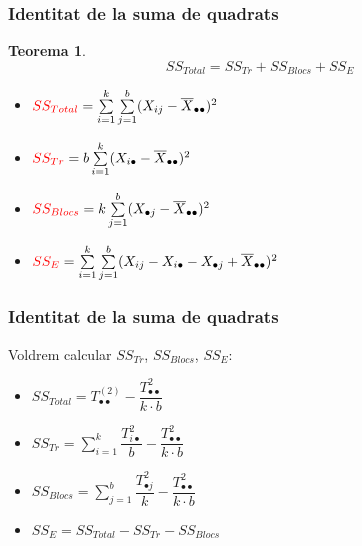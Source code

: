 \documentclass[12pt,t]{beamer}
\newcommand{\red}[1]{\textcolor{red}{#1}}
\theoremstyle{plain}
\newtheorem{teorema}{Teorema}
\theoremstyle{definition}
\begin{document}
\begin{frame}
\frametitle{Identitat de la suma de quadrats}
\begin{teorema}
$$
SS_{Total}=SS_{Tr}+SS_{Blocs}+SS_E
$$
\end{teorema}


\begin{itemize}
\item $\red{SS_{Total}} = \sum\limits_{i=1}^k\sum\limits_{j=1}^b (X_{ij}-
\overline{X}_{\bullet\bullet})^2$
\medskip

\item $\red{SS_{Tr}}=b \sum\limits_{i=1}^k
(X_{i\bullet}-\overline{X}_{\bullet\bullet})^2$\medskip

\item $\red{SS_{Blocs}}=k \sum\limits_{j=1}^b (X_{\bullet
j}-\overline{X}_{\bullet\bullet})^2 $
\medskip

\item $\red{SS_E}= \sum\limits_{i=1}^k\sum\limits_{j=1}^b (X_{ij} - X_{i\bullet}-
X_{\bullet j}+\overline{X}_{\bullet\bullet})^2$
\end{itemize}
\end{frame}


\begin{frame}
\frametitle{Identitat de la suma de quadrats}

Voldrem calcular $SS_{Tr}$, $SS_{Blocs}$, $SS_E$:
\medskip

\begin{itemize}
\item $\displaystyle SS_{Total}=T_{\bullet\bullet}^{(2)}-\dfrac{T_{\bullet\bullet}^2}{k\cdot b}$
\medskip

\item $\displaystyle SS_{Tr}= \sum\limits_{i=1}^k\dfrac{T_{i\bullet}^2}{b}-\dfrac{T_{\bullet\bullet}^2}{k\cdot b}$
\medskip


\item $\displaystyle SS_{Blocs}= \sum\limits_{j=1}^b \dfrac{T_{\bullet
j}^2}{k}-\dfrac{T_{\bullet\bullet}^2}{k\cdot b}$
\medskip

\item $SS_E=SS_{Total}-SS_{Tr}-SS_{Blocs}$
\end{itemize}

\end{frame}
\end{document}
